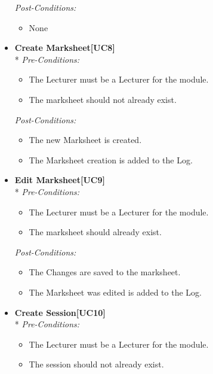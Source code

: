\documentclass[a4paper]{article}
\begin{document}
\begin{itemize}
						\textit{Post-Conditions:}
								\begin{itemize}
									\item None
								\end{itemize}
														
				\item	\textbf{Create Marksheet[UC8]}\\*
						\textit{Pre-Conditions:}
								\begin{itemize}
									\item The Lecturer must be a Lecturer for the module.
									\item The marksheet should not already exist.
								\end{itemize}
								
						\textit{Post-Conditions:}
								\begin{itemize}
									\item The new Marksheet is created.
									\item The Marksheet creation is added to the Log.
								\end{itemize}
														
				\item	\textbf{Edit Marksheet[UC9]}\\*
						\textit{Pre-Conditions:}
								\begin{itemize}
									\item The Lecturer must be a Lecturer for the module.
									\item The marksheet should already exist.
								\end{itemize}
								
						\textit{Post-Conditions:}
								\begin{itemize}
									\item The Changes are saved to the marksheet.
									\item The Marksheet was edited is added to the Log.
								\end{itemize}
														
				\item	\textbf{Create Session[UC10]}\\*
						\textit{Pre-Conditions:}
								\begin{itemize}
									\item The Lecturer must be a Lecturer for the module.
									\item The session should not already exist.
								\end{itemize}
								

\end{itemize}
\end{document}
